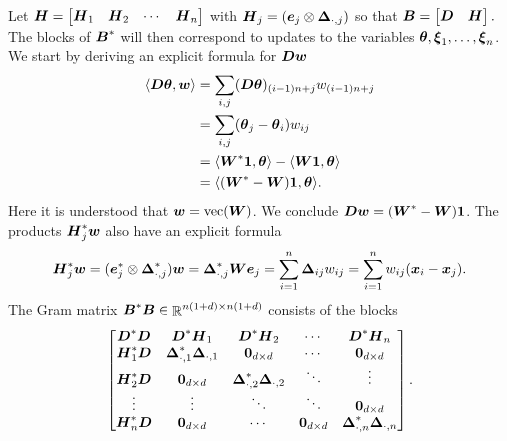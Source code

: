 \documentclass{article}
\begin{document}
Let
\(
\boldsymbol{H} = \begin{bmatrix}
    \boldsymbol{H}_{1} & \boldsymbol{H}_{2} & \cdots & \boldsymbol{H}_{n}
\end{bmatrix}
\)
with \(\boldsymbol{H}_{j} = (\boldsymbol{e}_{j} \otimes \boldsymbol{\Delta}_{\cdot, j})\) so that
\(
\boldsymbol{B}
=
\begin{bmatrix}
    \boldsymbol{D} & \boldsymbol{H}
\end{bmatrix}.
\)
The blocks of \(\boldsymbol{B}^{\ast}\) will then correspond to updates to the variables \(\boldsymbol{\theta}, \boldsymbol{\xi}_{1}, \ldots, \boldsymbol{\xi}_{n}\).
We start by deriving an explicit formula for \(\boldsymbol{D} \boldsymbol{w}\)
\begin{equation*}
    \begin{split}
        \langle{\boldsymbol{D}\boldsymbol{\theta}, \boldsymbol{w}}\rangle
        &=
        \sum_{i,j} (\boldsymbol{D} \boldsymbol{\theta})_{(i-1)n+j} w_{(i-1)n+j} \\
        &=
        \sum_{i,j} (\boldsymbol{\theta}_{j} - \boldsymbol{\theta}_{i}) w_{ij} \\
        &=
        \langle{\boldsymbol{W}^{\ast} \boldsymbol{1}, \boldsymbol{\theta}}\rangle
        -
        \langle{\boldsymbol{W}\boldsymbol{1}, \boldsymbol{\theta}}\rangle \\
        &=
        \langle{(\boldsymbol{W}^{\ast} - \boldsymbol{W}) \boldsymbol{1}, \boldsymbol{\theta}}\rangle.
    \end{split}
\end{equation*}
Here it is understood that \(\boldsymbol{w} = \mathop{\rm vec}\nolimits(\boldsymbol{W})\).
We conclude \(\boldsymbol{D} \boldsymbol{w} = (\boldsymbol{W}^{\ast} - \boldsymbol{W}) \boldsymbol{1}\).
The products \(\boldsymbol{H}_{j}^{\ast} \boldsymbol{w}\) also have an explicit formula
\begin{equation*}
    \boldsymbol{H}_{j}^{\ast} \boldsymbol{w}
    =
    (\boldsymbol{e}_{j}^{\ast} \otimes \boldsymbol{\Delta}_{\cdot,j}^{\ast}) \boldsymbol{w}
    =
    \boldsymbol{\Delta}_{\cdot,j}^{\ast} \boldsymbol{W} \boldsymbol{e}_{j}
    =
    \sum_{i=1}^{n} \boldsymbol{\Delta}_{ij} w_{ij}
    =
    \sum_{i=1}^{n} w_{ij}(\boldsymbol{x}_{i} - \boldsymbol{x}_{j}).
\end{equation*}
The Gram matrix \(\boldsymbol{B}^{\ast} \boldsymbol{B} \in \mathop{\mathbb{R}}\nolimits^{n(1+d) \times n(1+d)}\) consists of the blocks
\begin{equation*}
    \begin{bmatrix}
        \boldsymbol{D}^{\ast} \boldsymbol{D}
        & \boldsymbol{D}^{\ast} \boldsymbol{H}_{1}
        & \boldsymbol{D}^{\ast} \boldsymbol{H}_{2}
        & \cdots
        & \boldsymbol{D}^{\ast} \boldsymbol{H}_{n} \\
        \boldsymbol{H}_{1}^{\ast} \boldsymbol{D}
        & \boldsymbol{\Delta}_{\cdot,1}^{\ast} \boldsymbol{\Delta}_{\cdot,1}
        & \boldsymbol{0}_{d \times d}
        & \cdots
        & \boldsymbol{0}_{d \times d} \\
        \boldsymbol{H}_{2}^{\ast} \boldsymbol{D}
        & \boldsymbol{0}_{d \times d}
        & \boldsymbol{\Delta}_{\cdot,2}^{\ast} \boldsymbol{\Delta}_{\cdot,2}
        & \ddots
        & \vdots \\
        \vdots
        & \vdots
        & \ddots
        & \ddots
        & \boldsymbol{0}_{d \times d} \\
       \boldsymbol{H}_{n}^{\ast} \boldsymbol{D}
        & \boldsymbol{0}_{d \times d}
        & \cdots
        & \boldsymbol{0}_{d \times d}
        &\boldsymbol{\Delta}_{\cdot,n}^{\ast} \boldsymbol{\Delta}_{\cdot,n}
    \end{bmatrix}.
\end{equation*}
\end{document}
